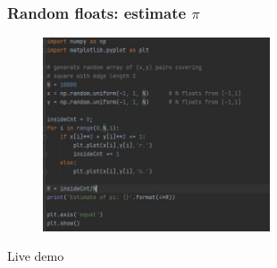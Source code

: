 \documentclass[english,14pt]{beamer}
\begin{document}

\begin{frame}[fragile]

\frametitle{Random floats: estimate $\pi$}

\begin{figure}[ht]
	\centering
	\includegraphics[width=0.6\textwidth]{figures/estimatePi}
\end{figure}

Live demo

\end{frame}

%
%
%
%
%
%
%
%
%
%
%
%
%
%

\end{document}
